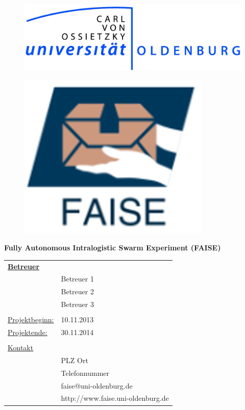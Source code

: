 \documentclass[11pt]{scrartcl}
\begin{document}
\begin{titlepage}
  \begin{centering}
  \begin{figure}[h!]
    \centering
    \includegraphics[natwidth=200bp,natheight=287bp, width=70bp]{CvO-Oldenburg-Logo}    %
  \end{figure}

  \vspace*{0.8cm}

  \begin{figure}[h!]
    \centering
    \includegraphics[natwidth=200bp,natheight=287bp, width=70bp]{faise_logo_gross}    %
  \end{figure}

  \vspace*{0.4cm}
  
  \textsf{\Huge \textbf{Fully Autonomous Intralogistic Swarm Experiment (FAISE)}}

  \vspace*{0.5cm}
	\begin{table}[h]
\centering
  \begin{tabular}{ll}
   \textbf{\underline{Betreuer}} &  \\
   & Betreuer 1 \\
	 & Betreuer 2 \\
	 & Betreuer 3 \\ 
	 &  \\
	 \underline{Projektbeginn:}& 10.11.2013 \\
		\underline{Projektende:}& 30.11.2014 \\
		&  \\
	  \underline{Kontakt} &  \\
		& PLZ Ort\\
    & Telefonnummer\\
		& faise@uni-oldenburg.de\\
		& http://www.faise.uni-oldenburg.de
\end{tabular}
\end{table}
  \end{centering}
  
\end{titlepage}
\end{document}
